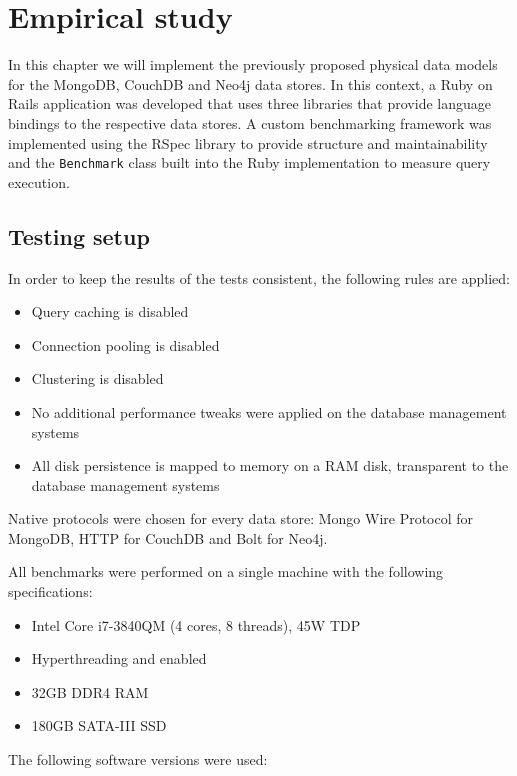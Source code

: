 \chapter{Empirical study}
\label{ch:empirical-study}

In this chapter we will implement the previously proposed physical data models for the MongoDB, CouchDB and Neo4j data stores.
In this context, a Ruby on Rails application was developed that uses three libraries that provide language bindings to the respective data stores.
A custom benchmarking framework was implemented using the RSpec library to provide structure and maintainability and the \texttt{Benchmark} class built into the Ruby implementation to measure query execution.

\section{Testing setup}
\label{sec:testing-setup}

In order to keep the results of the tests consistent, the following rules are applied:

\begin{itemize}
  \item Query caching is disabled
  \item Connection pooling is disabled
  \item Clustering is disabled
  \item No additional performance tweaks were applied on the database management systems
  \item All disk persistence is mapped to memory on a RAM disk, transparent to the database management systems
\end{itemize}

Native protocols were chosen for every data store: Mongo Wire Protocol for MongoDB, HTTP for CouchDB and Bolt for Neo4j.

All benchmarks were performed on a single machine with the following specifications:

\begin{itemize}
  \item Intel Core i7-3840QM (4 cores, 8 threads), 45W TDP
  \item Hyperthreading and  enabled
  \item 32GB DDR4 RAM
  \item 180GB SATA-III SSD
\end{itemize}

The following software versions were used:

